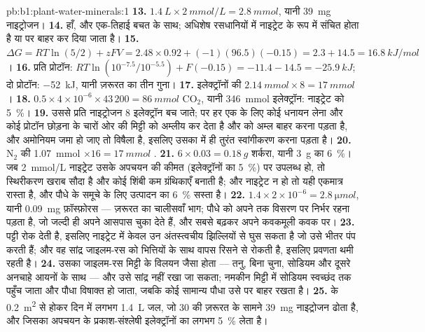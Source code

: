 \begin{solution}{pb:b1:plant-water-minerals:1}
\textbf{13.} $\qty{1.4}{L}\times\qty{2}{mmol/L} = \qty{2.8}{mmol}$,
यानी \qty{39}{mg} नाइट्रोजन।
\textbf{14.} हाँ, और एक-तिहाई बचत के साथ; अधिशेष रसधानियों में
नाइट्रेट के रूप में संचित होता है या  पर बाहर कर दिया जाता है।
\textbf{15.} $\Delta G = RT\ln(5/2) + zFV = 2.48\times 0.92 + (-1)(96.5)(-0.15)
= 2.3 + 14.5 = \qty{16.8}{kJ/mol}$।
\textbf{16.} प्रति प्रोटॉन: $RT\ln(10^{-7.5}/10^{-5.5}) + F(-0.15) =
-11.4 - 14.5 = \qty{-25.9}{kJ}$; दो प्रोटॉन: \qty{-52}{kJ}, यानी
ज़रूरत का तीन गुना।
\textbf{17.} इलेक्ट्रॉनों की $\qty{2.14}{mmol}\times 8 = \qty{17}{mmol}$।
\textbf{18.} $0.5\times 4\times 10^{-6}\times 43\,200 = \qty{86}{mmol}$
$\mathrm{CO_2}$, यानी \qty{346}{mmol} इलेक्ट्रॉन: नाइट्रेट को \qty{5}{\%}।
\textbf{19.} उससे प्रति नाइट्रोजन 8 इलेक्ट्रॉन बच जाते; पर हर एक के लिए
कोई धनायन लेना और कोई प्रोटॉन छोड़ना  के चारों ओर की मिट्टी को
अम्लीय कर देता है और  को अम्ल बाहर करना पड़ता है, और अमोनियम जमा
हो जाए तो विषैला है, इसलिए उसका  में ही तुरंत स्वांगीकरण करना पड़ता है।
\textbf{20.} $\mathrm{N_2}$ की \qty{1.07}{mmol} $\times 16 =
\qty{17}{mmol}$ .
\textbf{21.} $6\times 0.03 = \qty{0.18}{g}$ शर्करा, यानी \qty{3}{g} का
\qty{6}{\%}। जब \qty{2}{mmol/L} नाइट्रेट उसके अपचयन की कीमत
(इलेक्ट्रॉनों का \qty{5}{\%}) पर उपलब्ध हो, तो स्थिरीकरण खराब
सौदा है और कोई शिंबी कम ग्रंथिकाएँ बनाती है; और नाइट्रेट न हो तो यही
एकमात्र रास्ता है, और पौधे के समूचे  के लिए उत्पादन का \qty{6}{\%}
सस्ता है।
\textbf{22.} $1.4\times 2\times 10^{-6} = \qty{2.8}{\micro mol}$,
यानी \qty{0.09}{mg} फ़ॉस्फ़ोरस --- ज़रूरत का चालीसवाँ भाग; पौधे को
अपने  तक विसरण पर निर्भर रहना पड़ता है, जो जल्दी ही अपने आसपास
चुका देते हैं, और सबसे बढ़कर अपने कवकमूली कवक पर।
\textbf{23.} पट्टी  रोक देती है, इसलिए नाइट्रेट  में
केवल उन अंतस्त्वचीय झिल्लियों से घुस सकता है जो उसे भीतर पंप करती हैं; और
वह सांद्र जाइलम-रस को भित्तियों के साथ वापस रिसने से रोकती है, इसलिए
प्रवणता थमी रहती है।
\textbf{24.} उसका जाइलम-रस मिट्टी के विलयन जैसा होता --- तनु,
बिना चुना, सोडियम और दूसरे अनचाहे आयनों के साथ --- और उसे
सांद्र नहीं रखा जा सकता; नमकीन मिट्टी में सोडियम स्वच्छंद  तक
पहुँच जाता और पौधा विषाक्त हो जाता, जबकि कोई सामान्य पौधा उसे
 पर बाहर रखता है।
\textbf{25.}  के \qty{0.2}{m^2} से होकर दिन में लगभग \qty{1.4}{L}
जल, जो \qty{30}{} की ज़रूरत के सामने \qty{39}{mg} नाइट्रोजन ढोता है,
और जिसका अपचयन  के प्रकाश-संश्लेषी इलेक्ट्रॉनों का लगभग
\qty{5}{\%} लेता है।
\end{solution}
